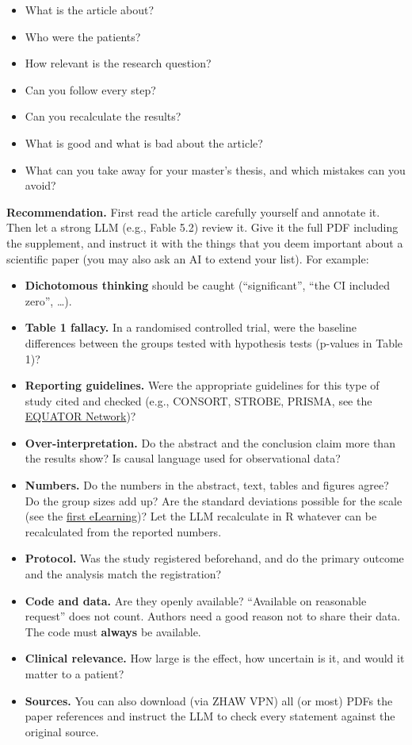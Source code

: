 \documentclass[
]{book}
\providecommand{\tightlist}{%
  \setlength{\itemsep}{0pt}\setlength{\parskip}{0pt}}
\begin{document}
\begin{itemize}
\tightlist
\item
  What is the article about?
\item
  Who were the patients?
\item
  How relevant is the research question?
\item
  Can you follow every step?
\item
  Can you recalculate the results?
\item
  What is good and what is bad about the article?
\item
  What can you take away for your master's thesis, and which mistakes can you avoid?
\end{itemize}

\textbf{Recommendation.} First read the article carefully yourself and annotate it. Then let a strong LLM (e.g., Fable 5.2) review it.
Give it the full PDF including the supplement, and instruct it with the things that you deem important about a scientific paper
(you may also ask an AI to extend your list). For example:

\begin{itemize}
\tightlist
\item
  \textbf{Dichotomous thinking} should be caught (``significant'', ``the CI included zero'', \ldots).
\item
  \textbf{Table 1 fallacy.} In a randomised controlled trial, were the baseline differences between the groups
  tested with hypothesis tests (p-values in Table 1)?
\item
  \textbf{Reporting guidelines.} Were the appropriate guidelines for this type of study cited and checked
  (e.g., CONSORT, STROBE, PRISMA, see the \href{https://www.equator-network.org}{EQUATOR Network})?
\item
  \textbf{Over-interpretation.} Do the abstract and the conclusion claim more than the results show?
  Is causal language used for observational data?
\item
  \textbf{Numbers.} Do the numbers in the abstract, text, tables and figures agree? Do the group sizes add up?
  Are the standard deviations possible for the scale (see the \hyperref[elearning_9_11]{first eLearning})?
  Let the LLM recalculate in R whatever can be recalculated from the reported numbers.
\item
  \textbf{Protocol.} Was the study registered beforehand, and do the primary outcome and the analysis match the registration?
\item
  \textbf{Code and data.} Are they openly available? ``Available on reasonable request'' does not count.
  Authors need a good reason not to share their data. The code must \textbf{always} be available.
\item
  \textbf{Clinical relevance.} How large is the effect, how uncertain is it, and would it matter to a patient?
\item
  \textbf{Sources.} You can also download (via ZHAW VPN) all (or most) PDFs the paper references
  and instruct the LLM to check every statement against the original source.
\end{itemize}
\end{document}
